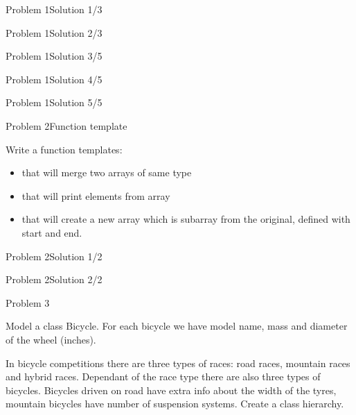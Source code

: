 \begin{frame}[fragile]{Problem 1}{Solution 1/3}

\end{frame}

\begin{frame}[fragile]{Problem 1}{Solution 2/3}

\end{frame}

\begin{frame}[fragile]{Problem 1}{Solution 3/5}

\end{frame}

\begin{frame}[fragile]{Problem 1}{Solution 4/5}

\end{frame}

\begin{frame}[fragile]{Problem 1}{Solution 5/5}

\end{frame}

\begin{frame}{Problem 2}{Function template}
\begin{scriptsize}
Write a function templates:
\begin{itemize}
  \item that will merge two arrays of same type
  \item that will print elements from array
  \item that will create a new array which is subarray from the original,
  defined with start and end.
\end{itemize}
\end{scriptsize}
\end{frame}

\begin{frame}[fragile]{Problem 2}{Solution 1/2}

\end{frame}

\begin{frame}[fragile]{Problem 2}{Solution 2/2}

\end{frame}

\begin{frame}{Problem 3}
\begin{scriptsize}
Model a class Bicycle. For each bicycle we have model name, mass and diameter of
the wheel (inches).

In bicycle competitions there are three types of races: road races, mountain
races and hybrid races. Dependant of the race type there are also three types of
bicycles. Bicycles driven on road have extra info about the width of the tyres,
mountain bicycles have number of suspension systems. Create a class hierarchy.
\end{scriptsize}
\end{frame}

